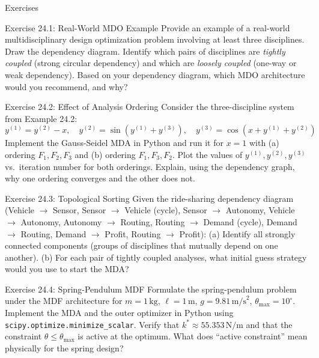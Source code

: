 \documentclass[aspectratio=169,10pt]{beamer}
\begin{document}
\begin{frame}[allowframebreaks]{Exercises}

  \begin{block}{Exercise 24.1: Real-World MDO Example}
    Provide an example of a real-world multidisciplinary design optimization
    problem involving at least three disciplines.  Draw the dependency
    diagram.  Identify which pairs of disciplines are \emph{tightly
    coupled} (strong circular dependency) and which are \emph{loosely
    coupled} (one-way or weak dependency).  Based on your dependency
    diagram, which MDO architecture would you recommend, and why?
  \end{block}

  \begin{block}{Exercise 24.2: Effect of Analysis Ordering}
    Consider the three-discipline system from Example 24.2:
    \[
      y^{(1)} = y^{(2)} - x, \quad
      y^{(2)} = \sin(y^{(1)} + y^{(3)}), \quad
      y^{(3)} = \cos(x + y^{(1)} + y^{(2)})
    \]
    Implement the Gauss-Seidel MDA in Python and run it for $x=1$ with
    (a) ordering $F_1, F_2, F_3$ and (b) ordering $F_1, F_3, F_2$.
    Plot the values of $y^{(1)}, y^{(2)}, y^{(3)}$ vs.\ iteration number
    for both orderings.  Explain, using the dependency graph, why one
    ordering converges and the other does not.
  \end{block}

  \begin{block}{Exercise 24.3: Topological Sorting}
    Given the ride-sharing dependency diagram (Vehicle $\to$ Sensor,
    Sensor $\to$ Vehicle (cycle), Sensor $\to$ Autonomy, Vehicle $\to$
    Autonomy, Autonomy $\to$ Routing, Routing $\to$ Demand (cycle),
    Demand $\to$ Routing, Demand $\to$ Profit, Routing $\to$ Profit):
    (a) Identify all strongly connected components (groups of disciplines
    that mutually depend on one another).
    (b) For each pair of tightly coupled analyses, what initial guess
    strategy would you use to start the MDA?
  \end{block}

  \framebreak

  \begin{block}{Exercise 24.4: Spring-Pendulum MDF}
    Formulate the spring-pendulum problem under the MDF architecture
    for $m = 1\,\mathrm{kg}$, $\ell = 1\,\mathrm{m}$,
    $g = 9.81\,\mathrm{m/s}^2$, $\theta_{\max} = 10^\circ$.
    Implement the MDA and the outer optimizer in Python using
    \texttt{scipy.optimize.minimize\_scalar}.
    Verify that $k^* \approx 55.353\,\mathrm{N/m}$ and that
    the constraint $\theta \leq \theta_{\max}$ is active at the
    optimum.  What does ``active constraint'' mean physically for
    the spring design?
  \end{block}


\end{frame}
\end{document}

